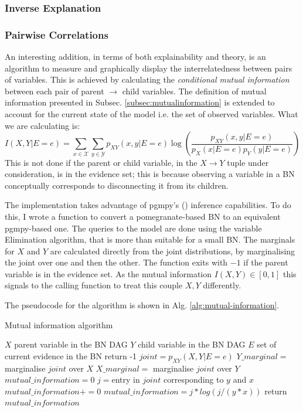 \subsubsection{Inverse Explanation}


\subsubsection{Pairwise Correlations}
An interesting addition, in terms of both explainability and theory, is an algorithm to measure and graphically display the interrelatedness between pairs of variables.
This is achieved by calculating the \textit{conditional mutual information} between each pair of parent $\rightarrow$ child variables.
The definition of mutual information presented in Subsec. \ref{subsec:mutualinformation} is extended to account for the current state of the model i.e. the set of observed variables.
What we are calculating is:
\begin{equation}
	I(X,Y|E=e) = \sum_{x \in \mathcal{X}} \sum_{y \in \mathcal{Y}} p_{XY}(x,y|E=e) \log \left( \frac{p_{XY}(x, y|E=e)}{p_{X}(x|E=e) p_{Y}(y|E=e)} \right)
\end{equation}
This is not done if the parent or child variable, in the $X \rightarrow Y$ tuple under consideration, is in the evidence set; this is because observing a variable in a BN conceptually corresponds to disconnecting it from its children.

The implementation takes advantage of pgmpy's (\cite{pgmpy}) inference capabilities. 
To do this, I wrote a function to convert a pomegranate-based BN to an equivalent pgmpy-based one.
The queries to the model are done using the variable Elimination algorithm, that is more than suitable for a small BN.
The marginals for $X$ and $Y$ are calculated directly from the joint distributions, by marginalising the joint over one and then the other.
The function exits with $-1$ if the parent variable is in the evidence set.
As the mutual information $I(X,Y) \in [0,1]$ this signals to the calling function to treat this couple $X,Y$ differently.

The pseudocode for the algorithm is shown in Alg. \ref{alg:mutual-information}.

\begin{algorithm}[htp!]
	\caption{Mutual information algorithm}
	\label{alg:mutual-information}
	\begin{algorithmic}[1]
		\State $X$ parent variable in the BN DAG
		\State $Y$ child variable in the BN DAG
		\State $E$ set of current evidence in the BN
			\State return -1
		\EndIf
		\State $joint=p_{XY}(X, Y|E=e)$
		\State $Y\_marginal=$ marginalise $joint$ over $X$
		\State $X\_marginal=$ marginalise $joint$ over $Y$
		\State $mutual\_information = 0$
				\State $j=$entry in $joint$ corresponding to $y$ and $x$
					\State $mutual\_information += 0$
				\Else
					\State $mutual\_information = j * log( j / ( y * x ) )$
				\EndIf
			\EndFor
		\EndFor
		\State return $mutual\_information$
	\end{algorithmic}
\end{algorithm}

